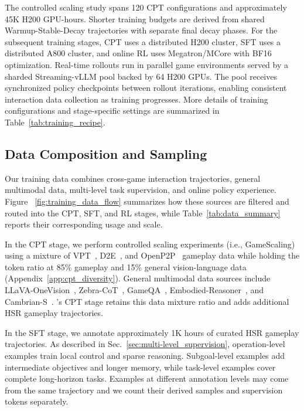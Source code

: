 The controlled scaling study spans 120 CPT configurations and approximately 45K H200 GPU-hours. Shorter training budgets are derived from shared Warmup-Stable-Decay trajectories with separate final decay phases. For the subsequent \ourmodel training stages, CPT uses a distributed H200 cluster, SFT uses a distributed A800 cluster, and online RL uses Megatron/MCore with BF16 optimization. Real-time rollouts run in parallel game environments served by a sharded Streaming-vLLM pool backed by 64 H200 GPUs. The pool receives synchronized policy checkpoints between rollout iterations, enabling consistent interaction data collection as training progresses. More details of training configurations and stage-specific settings are summarized in Table~\ref{tab:training_recipe}.

\subsection{Data Composition and Sampling}
\label{sec:data_composition}

Our training data combines cross-game interaction trajectories, general multimodal data, multi-level task supervision, and online policy experience. Figure ~\ref{fig:training_data_flow} summarizes how these sources are filtered and routed into the CPT, SFT, and RL stages, while Table~\ref{tab:data_summary} reports their corresponding usage and scale.



In the CPT stage, we perform controlled scaling experiments (i.e., GameScaling) using a mixture of VPT~\cite{baker2022vpt}, D2E~\cite{choi2026d2e}, and OpenP2P~\cite{yue2026openp2p} gameplay data while holding the token ratio at 85\% gameplay and 15\% general vision-language data (Appendix~\ref{app:cpt_diversity}). General multimodal data sources include LLaVA-OneVision~\cite{llava-o}, Zebra-CoT~\cite{li2026zebracot}, GameQA~\cite{tong2026gamerl}, Embodied-Reasoner~\cite{zhang2025embodiedreasoner}, and Cambrian-S~\cite{yang2025cambrians}. \ourmodel's CPT stage retains this data mixture ratio and adds additional HSR gameplay trajectories.

In the SFT stage, we annotate approximately 1K hours of curated HSR gameplay trajectories. As described in Sec.~\ref{sec:multi-level_supervision}, operation-level examples train local control and sparse reasoning. Subgoal-level examples add intermediate objectives and longer memory, while task-level examples cover complete long-horizon tasks. Examples at different annotation levels may come from the same trajectory and we count their derived samples and supervision tokens separately. 

